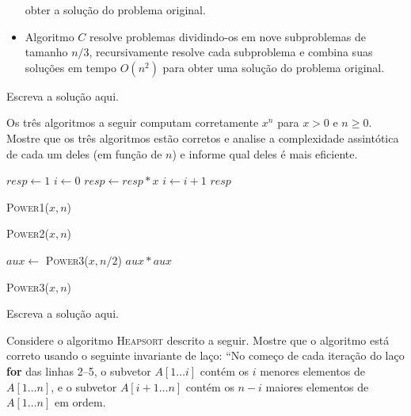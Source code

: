 \documentclass[a4paper]{exam}
\begin{document}
\begin{questions}
\begin{itemize}
      obter a solução do problema original.
    \item Algoritmo $C$ resolve problemas dividindo-os em nove 
      subproblemas de tamanho $n/3$, recursivamente resolve cada
      subproblema e combina suas soluções em tempo $O(n^2)$ para obter
      uma solução do problema original.
  \end{itemize}
  \begin{solution}
    Escreva a solução aqui.
  \end{solution}
  \question Os três algoritmos a seguir computam corretamente
  $x^n$ para $x>0$ e $n \geq 0$. Mostre que os três algoritmos estão
  corretos e analise a complexidade assintótica
  de cada um deles (em função de $n$) e informe qual deles é mais
  eficiente.
  \setlength{\algoheightrule}{0pt}
  \setlength{\algotitleheightrule}{0pt}
  \begin{center}
    \vspace{-1cm}
    \begin{minipage}[t][][c]{.25\textwidth}
      \begin{algorithm}[H]
        \NoCaptionOfAlgo
        \DontPrintSemicolon
        $resp \gets 1$\;
        $i \gets 0$\;
         {
          $resp \gets resp * x$\;
          $i \gets i + 1$\;
        }
        \Return $resp$\;
        \caption{\textsc{Power1}($x, n$)}
      \end{algorithm}
    \end{minipage}%
  \begin{minipage}[t][][c]{.35\textwidth} 
      \begin{algorithm}[H]
        \NoCaptionOfAlgo
        \DontPrintSemicolon
        \caption{\textsc{Power2}($x,n$)}
      \end{algorithm}
    \end{minipage}%
    \begin{minipage}[t][][c]{.38\textwidth} 
      \begin{algorithm}[H]
        \NoCaptionOfAlgo
        \DontPrintSemicolon
         {
          $aux \leftarrow $ \textsc{Power3}($x, n/2$)\;
          \Return $aux*aux$\;
        }
        \caption{\textsc{Power3}($x,n$)}
      \end{algorithm}
    \end{minipage}
  \end{center}
  \begin{solution}
    Escreva a solução aqui.
  \end{solution}
  \question Considere o algoritmo \textsc{Heapsort} descrito a
  seguir. Mostre que o algoritmo está correto usando o seguinte
  invariante de laço: ``No começo de cada iteração do laço
  \textbf{for} das linhas 2--5, o subvetor $A[1 \dots i]$ contém os $i$
  menores elementos de $A[1 \dots n]$, e o subvetor $A[i{+}1 \dots n]$ contém
  os $n-i$ maiores elementos de $A[1 \dots n]$ em ordem.


\end{questions}
\end{document}
